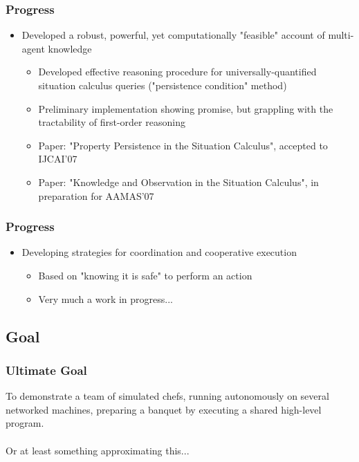 \documentclass[compress]{beamer}
\begin{document}
\begin{frame}
\frametitle{Progress}
\begin{itemize}
\item Developed a robust, powerful, yet computationally "feasible" account
of multi-agent knowledge
  \begin{itemize}
  \item Developed effective reasoning procedure for universally-quantified situation calculus queries ("persistence condition" method)
  \item Preliminary implementation showing promise, but grappling with the
tractability of first-order reasoning
  \item Paper: "Property Persistence in the Situation Calculus", accepted to IJCAI'07
  \item Paper: "Knowledge and Observation in the Situation Calculus", in preparation for AAMAS'07
  \end{itemize}
\end{itemize}
\end{frame}

\begin{frame}
\frametitle{Progress}
\begin{itemize}
\item Developing strategies for coordination and cooperative execution
  \begin{itemize}
  \item Based on "knowing it is safe" to perform an action
  \item Very much a work in progress...
  \end{itemize}
\end{itemize}
\end{frame}

\subsection{Goal}

\begin{frame}
\frametitle{Ultimate Goal}
To demonstrate a team of simulated chefs, running autonomously on
several networked machines, preparing a banquet by executing a shared
high-level program.
\pause
\\\ 
\\
Or at least something approximating this...
\end{frame}
\end{document}
